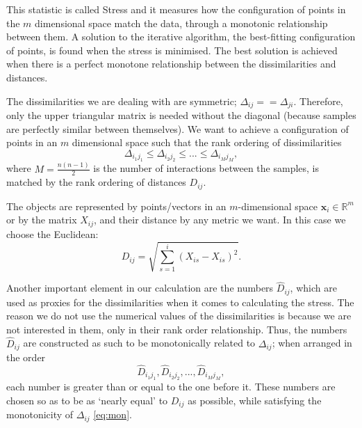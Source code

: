 This statistic is called Stress and it measures how the configuration of points in the $m$ dimensional space match the data, through a monotonic relationship between them. A solution to the iterative algorithm, the best-fitting configuration of points, is found when the stress is minimised. The best solution is achieved when there is a perfect monotone relationship between the dissimilarities and distances. 

The dissimilarities we are dealing with are symmetric; $\Delta_{ij} ==\Delta_{ji}$. Therefore, only the upper triangular matrix is needed without the diagonal (because samples are perfectly similar between themselves). We want to achieve a configuration of points in an $m$ dimensional space such that the rank ordering of dissimilarities
\begin{equation}
	\Delta_{i_1 j_1} \leq 	\Delta_{i_2 j_2} \leq ... \leq 	\Delta_{i_M j_M},
	\label{eq:mon}
\end{equation}
where $M = \frac{n(n-1)}{2}$ is the number of interactions between the samples, is matched by the rank ordering of distances $D_{ij}$.

The objects are represented by points/vectors in an $m$-dimensional space ${ \mathbf x}_i \in \mathbb{R}^m$ or by the matrix $X_{ij}$, and their distance by any metric we want. In this case we choose the Euclidean:
\begin{equation}
	D_{i j}=\sqrt{\sum_{s=1}^{i}\left(X_{i s}-X_{i s}\right)^{2}}.
\end{equation}


Another important element in our calculation are the numbers $\hat{D}_{ij}$, which are used as proxies for the dissimilarities when it comes to calculating the stress. The reason we do not use the numerical values of the dissimilarities is because we are not interested in them, only in their rank order relationship. Thus, the numbers $\hat{D}_{ij}$ are constructed as such to be monotonically related to $\Delta_{ij}$; when arranged in the order
\begin{equation}
	\hat{D}_{i_1 j_1},	\hat{D}_{i_2 j_2}, ...,	\hat{D}_{i_M j_M},
\end{equation}
each number is greater than or equal to the one before it. 
These numbers are chosen so as to be as `nearly equal' to $D_{ij}$ as possible, while satisfying the monotonicity of $\Delta_{ij}$ \eqref{eq:mon}. 


